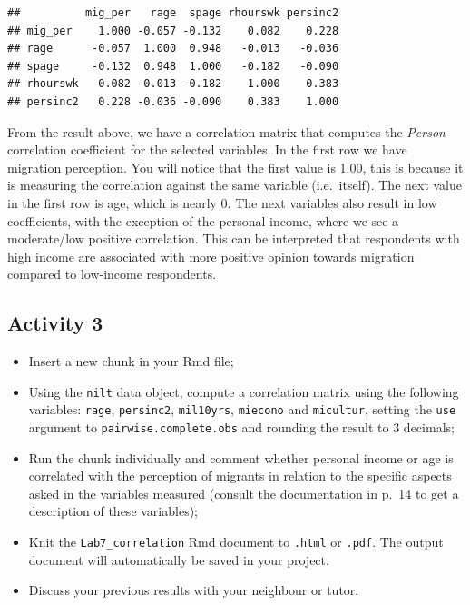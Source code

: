 \documentclass[
]{book}
\providecommand{\tightlist}{%
  \setlength{\itemsep}{0pt}\setlength{\parskip}{0pt}}
\begin{document}
\begin{verbatim}
##          mig_per   rage  spage rhourswk persinc2
## mig_per    1.000 -0.057 -0.132    0.082    0.228
## rage      -0.057  1.000  0.948   -0.013   -0.036
## spage     -0.132  0.948  1.000   -0.182   -0.090
## rhourswk   0.082 -0.013 -0.182    1.000    0.383
## persinc2   0.228 -0.036 -0.090    0.383    1.000
\end{verbatim}

From the result above, we have a correlation matrix that computes the \emph{Person} correlation coefficient for the selected variables. In the first row we have migration perception. You will notice that the first value is 1.00, this is because it is measuring the correlation against the same variable (i.e.~itself). The next value in the first row is age, which is nearly 0. The next variables also result in low coefficients, with the exception of the personal income, where we see a moderate/low positive correlation. This can be interpreted that respondents with high income are associated with more positive opinion towards migration compared to low-income respondents.

\hypertarget{activity-3-1}{%
\subsection{Activity 3}\label{activity-3-1}}

\begin{itemize}
\tightlist
\item
  Insert a new chunk in your Rmd file;
\item
  Using the \texttt{nilt} data object, compute a correlation matrix using the following variables: \texttt{rage}, \texttt{persinc2}, \texttt{mil10yrs}, \texttt{miecono} and \texttt{micultur}, setting the \texttt{use} argument to \texttt{\textquotesingle{}pairwise.complete.obs\textquotesingle{}} and rounding the result to 3 decimals;
\item
  Run the chunk individually and comment whether personal income or age is correlated with the perception of migrants in relation to the specific aspects asked in the variables measured (consult the documentation in p.~14 to get a description of these variables);
\item
  Knit the \texttt{Lab7\_correlation} Rmd document to \texttt{.html} or \texttt{.pdf}. The output document will automatically be saved in your project.
\item
  Discuss your previous results with your neighbour or tutor.
\end{itemize}
\end{document}
